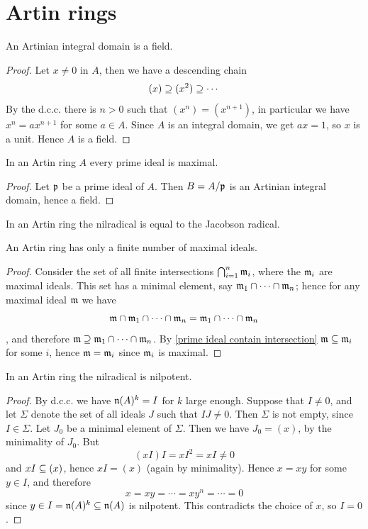 \section{Artin rings}
\begin{proposition}\label{Artinian domain is field}
An Artinian integral domain is a field.
\end{proposition}
\begin{proof}
Let $x\neq 0$ in $A$, then we have a descending chain
\[(x)\supseteq(x^2)\supseteq\cdots\]
By the d.c.c. there is $n>0$ such that $(x^n)=(x^{n+1})$, in particular we have $x^{n}=ax^{n+1}$ for some $a\in A$. Since $A$ is an integral domain, we get $ax=1$, so $x$ is a unit. Hence $A$ is a field.
\end{proof}
\begin{proposition}\label{Artinian prime ideal is maximal}
In an Artin ring $A$ every prime ideal is maximal.
\end{proposition}
\begin{proof}
Let $\mathfrak{p}$ be a prime ideal of $A$. Then $B=A/\mathfrak{p}$ is an Artinian integral domain, hence a field.
\end{proof}
\begin{corollary}
In an Artin ring the nilradical is equal to the Jacobson radical.
\end{corollary}
\begin{proposition}\label{Artinian maximal ideal finitely many}
An Artin ring has only a finite number of maximal ideals.
\end{proposition}
\begin{proof}
Consider the set of all finite intersections $\bigcap_{i=1}^n\mathfrak{m}_i$, where the $\mathfrak{m}_i$ are maximal ideals. This set has a minimal element, say $\mathfrak{m}_1\cap\cdots\cap\mathfrak{m}_n$; hence for any maximal ideal $\mathfrak{m}$ we have 
\[\mathfrak{m}\cap\mathfrak{m}_1\cap\cdots\cap\mathfrak{m}_n=\mathfrak{m}_1\cap\cdots\cap\mathfrak{m}_n\], and therefore $\mathfrak{m}\supseteq\mathfrak{m}_1\cap\cdots\cap\mathfrak{m}_n$. By \cref{prime ideal contain intersection} $\mathfrak{m}\subseteq\mathfrak{m}_i$ for some $i$, hence $\mathfrak{m}=\mathfrak{m}_i$ since $\mathfrak{m}_i$ is maximal.
\end{proof}
\begin{proposition}\label{Artinian nilradical is nilpotent}
In an Artin ring the nilradical is nilpotent.
\end{proposition}
\begin{proof}
By d.c.c. we have $\mathfrak{n}(A)^k=I$ for $k$ large enough. Suppose that $I\neq 0$, and let $\Sigma$ denote the set of all ideals $J$ such that $IJ\neq 0$. Then $\Sigma$ is not empty, since $I\in\Sigma$. Let $J_0$ be a minimal element of $\Sigma$. Then we have $J_0=(x)$, by the minimality of $J_0$. But
\[(xI)I=xI^2=xI\neq 0\]
and $xI\subseteq(x)$, hence $xI=(x)$ (again by minimality). Hence $x=xy$ for some $y\in I$, and therefore
\[x=xy=\cdots=xy^n=\cdots=0\]
since $y\in I=\mathfrak{n}(A)^k\subseteq \mathfrak{n}(A)$ is nilpotent. This contradicts the choice of $x$, so $I=0$.
\end{proof}
